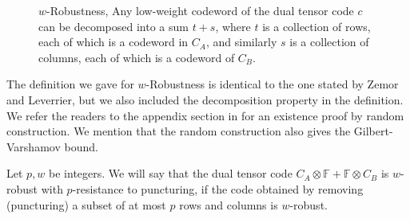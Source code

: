 \begin{figure}[H]
  \label{fig:wrobustf}
            \caption{$w$-Robustness, Any low-weight codeword of the dual tensor code $c$ can be decomposed into a sum $t+s$, where $t$ is a collection of rows, each of which is a codeword in $C_A$, and similarly $s$ is a collection of columns, each of which is a codeword of $C_B$. }
\end{figure}



The definition we gave for $w$-Robustness is identical to the one stated by Zemor and Leverrier, but we also included the decomposition property in the definition. We refer the readers to the appendix section in \cite{leverrier2022quantum} for an existence proof by random construction. We mention that the random construction also gives the Gilbert-Varshamov bound.

\begin{definition} Let $p,w$ be integers. We will say that the dual tensor code $C_{A} \otimes \mathbb{F} + \mathbb{F} \otimes C_{B}$ is $w$-robust with $p$-resistance to puncturing, if the code obtained by removing (puncturing) a subset of at most $p$ rows and columns is $w$-robust.   
\end{definition}

